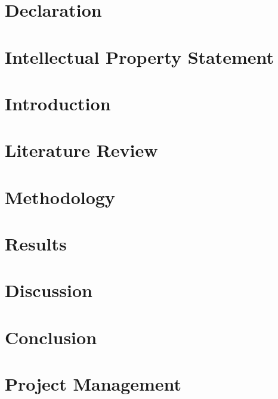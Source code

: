 \documentclass[12pt,twoside]{report}
\begin{document}


\tableofcontents
\listoftables
\listoffigures
\lstlistoflistings





\chapter*{Declaration}


\chapter*{Intellectual Property Statement}




\chapter{Introduction}


\chapter{Literature Review}


\chapter{Methodology}


\chapter{Results}


\chapter{Discussion}


\chapter{Conclusion}


\appendix
\chapter{Project Management}

\end{document}
